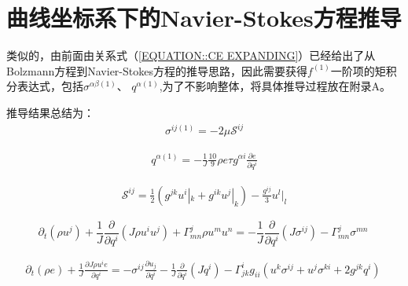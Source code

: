 \documentclass[LBMDerivation.tex]{subfiles}
\begin{document}
\section{曲线坐标系下的Navier-Stokes方程推导}
%
%

类似的，由前面由关系式（\ref{EQUATION::CE EXPANDING}）已经给出了从Bolzmann方程到Navier-Stokes方程的推导思路，因此需要获得$f^{(1)}$一阶项的矩积分表达式，包括$\sigma^{\alpha\beta(1)}$、 $q^{\alpha (1)}$,为了不影响整体，将具体推导过程放在附录A。

推导结果总结为：
\begin{equation}
  \begin{gathered}
    \sigma^{ij(1)}=  - 2 \mu \mathcal{S}^{ij}
  \end{gathered}
\end{equation}



\begin{equation}
  \begin{gathered}
    q^{\alpha (1)}
    = -\frac{1}{J}\frac{10}{9}\rho e \tau g^{\alpha i}\frac{\partial e}{\partial q^i}
  \end{gathered}
\end{equation}


\begin{equation}
  \begin{gathered}
    \mathcal{S}^{ij}=\frac{1}{2} (g^{jk} u^i|_k+g^{ik} u^j|_k) -\frac{g^{ij}}{3}u^l|_l
  \end{gathered}
\end{equation}




\begin{equation}
  \boxed{
    \partial_{t}\left(\rho u^{j}\right)+\frac{1}{J} \frac{\partial}{\partial q^{i}}\left(J \rho u^{i} u^{j} \right)+\Gamma_{mn}^{j} \rho u^{m} u^{n} = - \frac{1}{J} \frac{\partial}{\partial q^{i}}\left(J \sigma^{ij} \right) -\Gamma_{mn}^{j} \sigma^{mn}
  }
  \label{动量方程输运形式} ~
\end{equation}
%

\begin{equation}
  \begin{gathered}
    \boxed{
    \partial_{t}\left(\rho e\right) + \frac{1}{J}\frac{\partial J \rho u^i e}{\partial  q^{i}}  = -\sigma^{ij}  \frac{\partial  u_j}{\partial q^{i}}  - \frac{1}{J}\frac{\partial}{\partial q^{i}} (J q^{i})  - \Gamma^i_{j k}g_{ii}(u^k \sigma^{ij}+u^j \sigma^{ki}+ 2g^{jk}q^i)
    }
  \end{gathered}
  \label{动量方程输运形式4} ~
\end{equation}
\end{document}

